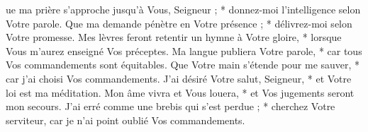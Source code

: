 ue ma prière s'approche jusqu'à Vous, Seigneur ; * donnez-moi l'intelligence selon Votre parole.
\versseparator
Que ma demande pénètre en Votre présence ; * délivrez-moi selon Votre promesse.
\versseparator
Mes lèvres feront retentir un hymne à Votre gloire, * lorsque Vous m'aurez enseigné Vos préceptes.
\versseparator
Ma langue publiera Votre parole, * car tous Vos commandements sont équitables.
\versseparator
Que Votre main s'étende pour me sauver, * car j'ai choisi Vos commandements.
\versseparator
J'ai désiré Votre salut, Seigneur, * et Votre loi est ma méditation.
\versseparator
Mon âme vivra et Vous louera, * et Vos jugements seront mon secours.
\versseparator
J'ai erré comme une brebis qui s'est perdue ; * cherchez Votre serviteur, car je n'ai point oublié Vos commandements.